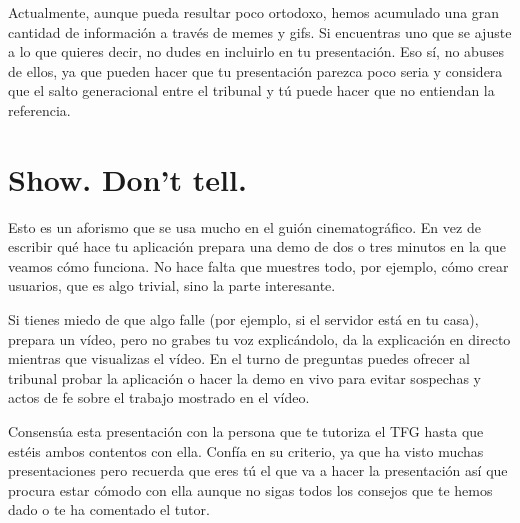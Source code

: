 Actualmente, aunque pueda resultar poco ortodoxo, hemos acumulado una gran cantidad de información a través de memes y gifs. Si encuentras uno que se ajuste a lo que quieres decir, no dudes en incluirlo en tu presentación. Eso sí, no abuses de ellos, ya que pueden hacer que tu presentación parezca poco seria y considera que el salto generacional entre el tribunal y tú puede hacer que no entiendan la referencia. 

\section{Show. Don't tell.}

Esto es un aforismo que se usa mucho en el guión cinematográfico. En vez de escribir qué hace tu aplicación prepara una demo de dos o tres minutos en la que veamos cómo funciona. No hace falta que muestres todo, por ejemplo, cómo crear usuarios, que es algo trivial, sino la parte interesante.

Si tienes miedo de que algo falle (por ejemplo, si el servidor está en tu casa), prepara un vídeo, pero no grabes tu voz explicándolo, da la explicación en directo mientras que visualizas el vídeo. En el turno de preguntas puedes ofrecer al tribunal probar la aplicación o hacer la demo en vivo para evitar sospechas y actos de fe sobre el trabajo mostrado en el vídeo.

Consensúa esta presentación con la persona que te tutoriza el TFG hasta que estéis ambos contentos con ella. Confía en su criterio, ya que ha visto muchas presentaciones pero recuerda que eres tú el que va a hacer la presentación así que procura estar cómodo con ella aunque no sigas todos los consejos que te hemos dado o te ha comentado el tutor.


